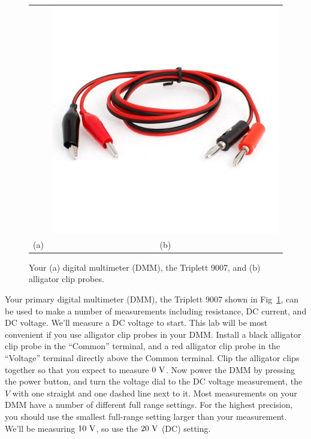 \begin{figure}[htbp]
\begin{center}
\begin{tabular}{cc}
\begin{tikzpicture}
\end{tikzpicture}&
\includegraphics[height=0.2\textheight]{figs/labs/dc_circuits/alligator.jpg}
\\
(a) & (b) \\
\end{tabular}
\caption{Your (a) digital multimeter (DMM), the Triplett 9007, and (b) alligator clip probes.}
\label{fig:triplett}
\end{center}
\end{figure}

Your primary digital multimeter (DMM), the Triplett 9007 shown in
Fig~\ref{fig:triplett}, can be used to make a number of measurements
including resistance, DC current, and DC voltage.  We'll measure a DC
voltage to start.  This lab will be most convenient if you use
alligator clip probes in your DMM.  Install a black alligator clip
probe in the ``Common'' terminal, and a red alligator clip probe in
the ``Voltage'' terminal directly above the Common terminal.  Clip the
alligator clips together so that you expect to measure $0~\rm V$.  Now
power the DMM by pressing the power button, and turn the voltage dial
to the DC voltage measurement, the $V$ with one straight and one
dashed line next to it.  Most measurements on your DMM have a number
of different full range settings.  For the highest precision, you
should use the smallest full-range setting larger than your
measurement.  We'll be measuring $10~\rm V$, so use the $20~\rm V$
(DC) setting.

